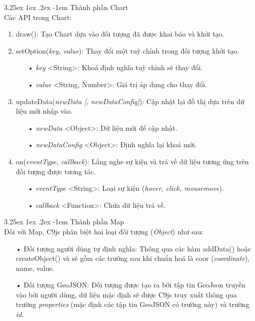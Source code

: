 \documentclass[12pt,a4paper,twoside]{article}
\makeatletter
\newcommand{\myparagraph}[1]{\paragraph{#1}\mbox{}\\} %
\renewcommand\paragraph{\@startsection{paragraph}{5}{\z@}%
  {3.25ex \@plus1ex \@minus.2ex}%
  {-1em}%
  {\normalfont\normalsize\bfseries}}
\makeatother
\begin{document}
\myparagraph{Thành phần Chart}
Các API trong Chart:
\begin{enumerate}
\item \textsf{draw():}  Tạo Chart dựa vào đối tượng đã được khai báo và khởi tạo.

\item \textsf{setOption(\textit{key, value})}: Thay đổi một tuỳ chỉnh trong đối tượng khởi tạo.
	\begin{itemize}
		\item[•] \textit{key} <String>: Khoá định nghĩa tuỳ chỉnh sẽ thay đổi.
		\item[•] \textit{value} <String, Number>: Giá trị áp dụng cho thay đổi.
	\end{itemize}
	
\item \textsf{updateData(\textit{newData [, newDataConfig]})}: Cập nhật lại đồ thị dựa trên dữ liệu mới nhập vào.
	\begin{itemize}
		\item[•] \textit{newData} <Object>: Dữ liệu mới để cập nhật.
		\item[•] \textit{newDataConfig } <Object>: Định nghĩa lại khoá mới.
	\end{itemize}
	
\item \textsf{on(\textit{eventType, callback})}: Lắng nghe sự kiện và trả về dữ liệu tương ứng trên đối tượng được tương tác.
	\begin{itemize}
		\item[•] \textit{eventType} <String>: Loại sự kiện (\textit{hover, click, mousemove}).
		\item[•] \textit{callback} <Function>: Chứa dữ liệu trả về.
	\end{itemize}
\end{enumerate}

\myparagraph{Thành phần Map}
Đối với Map, C9js phân biệt hai loại đối tượng (\textit{Object}) như sau: \label{sec:map_api}

\begin{itemize}
\item[•] Đối tượng người dùng tự định nghĩa: Thông qua các hàm \textsf{addData()} hoặc \textsf{createObject()} và sẽ gồm các trường sau khi chuẩn hoá là coor (\textit{coordinate}), name, value.
\item[•] Đối tượng GeoJSON: Đối tượng được tạo ra bởi tập tin GeoJson truyền vào bởi người dùng, dữ liệu mặc định sẽ được C9js truy xuất thông qua trường \textit{properties} (mặc định các tập tin GeoJSON có trường này) và trường \textit{id}.
\end{itemize}
\end{document}
